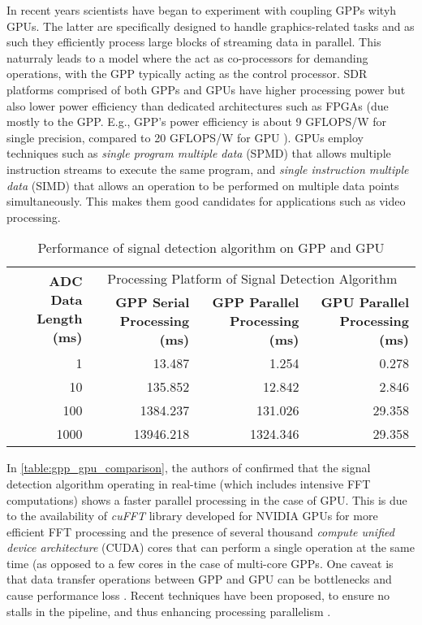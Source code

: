 In recent years scientists have began to experiment with coupling GPPs wityh GPUs. The latter are specifically designed to handle graphics-related tasks and as such they efficiently process large blocks of streaming data in parallel. This naturraly leads to a model where the act as co-processors for demanding operations, with the GPP typically acting as the control processor. SDR platforms comprised of both GPPs and GPUs have higher processing power but also lower power efficiency than dedicated architectures such as FPGAs (due mostly to the GPP. E.g., GPP's power efficiency is about 9 GFLOPS/W for single precision, compared to 20 GFLOPS/W for GPU \cite{v2014a}). GPUs employ techniques such as \emph{single program multiple data} (SPMD) that allows multiple instruction streams to execute the same program, and \emph{single instruction multiple data} (SIMD) that allows an operation to be performed on multiple data points simultaneously. This makes them good candidates for applications such as video processing.

\begin{table}[ht]
  \caption{Performance of signal detection algorithm on GPP and GPU \cite{fi2017a}}
  \label{table:gpp_gpu_comparison}
  \centering
  \begin{adjustbox}{width=1\textwidth}
  \begin{tabular}{r|r|r|r}
    \toprule
    \multirow{2}{*}{\textbf{ADC Data Length (ms)}} & \multicolumn{3}{c}{Processing Platform of Signal Detection Algorithm} \\
    \multirow{2}{*}{} & \textbf{GPP Serial Processing (ms)} & \textbf{GPP Parallel Processing (ms)} & \textbf{GPU Parallel Processing (ms)} \\
    \midrule
    1    & 13.487    & 1.254    & 0.278 \\
    10   & 135.852   & 12.842   & 2.846 \\
    100  & 1384.237  & 131.026  & 29.358 \\
    1000 & 13946.218 & 1324.346 & 29.358 \\
    \bottomrule
  \end{tabular}
  \end{adjustbox}
\end{table}

In \autoref{table:gpp_gpu_comparison}, the authors of \cite{fi2017a} confirmed that the signal detection algorithm operating in real-time (which includes intensive FFT computations) shows a faster parallel processing in the case of GPU. This is due to the availability of \emph{cuFFT} library developed for NVIDIA GPUs for more efficient FFT processing \cite{cuda_toolkit} and the presence of several thousand \emph{compute unified device architecture} (CUDA) cores that can perform a single operation at the same time (as opposed to a few cores in the case of multi-core GPPs. One caveat is that data transfer operations between GPP and GPU can be bottlenecks and cause performance loss \cite{li2014a}. Recent techniques have been proposed, to ensure no stalls in the pipeline, and thus enhancing processing parallelism \cite{accelerating_massive_mimo_uplink} \cite{millage2010a}.

